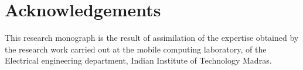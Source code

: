 \chapter{Acknowledgements}


This research monograph is the result  of assimilation of the expertise obtained by the research work carried out at the mobile computing laboratory, of the Electrical engineering department, Indian Institute of Technology Madras.


